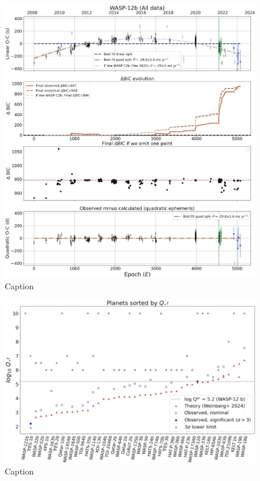 \documentclass[oneside,12pt]{amsart}
\numberwithin{page}{section}
\begin{document}
\begin{figure}[htbp]
    \centering
    \includegraphics[width=\linewidth]{figs/adams_fig3.png}
    \caption{Caption}
    \label{fig:enter-label}
\end{figure}

\begin{figure}[htbp]
    \centering
    \includegraphics[width=\linewidth]{figs/adams_fig11.png}
    \caption{Caption}
    \label{fig:enter-label}
\end{figure}
\end{document}
